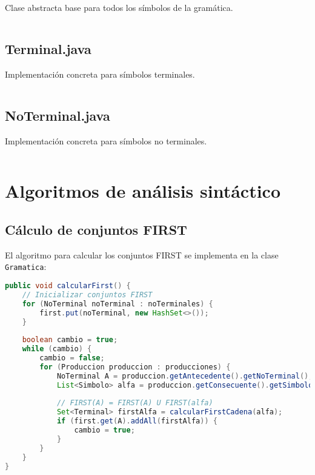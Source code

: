 Clase abstracta base para todos los símbolos de la gramática.

\inputminted[linenos,breaklines,firstline=1,lastline=30]{java}{codigo/src/gramatica/Simbolo.java}

\subsection{Terminal.java}

Implementación concreta para símbolos terminales.

\inputminted[linenos,breaklines,firstline=1,lastline=25]{java}{codigo/src/gramatica/Terminal.java}

\subsection{NoTerminal.java}

Implementación concreta para símbolos no terminales.

\inputminted[linenos,breaklines,firstline=1,lastline=25]{java}{codigo/src/gramatica/NoTerminal.java}

\section{Algoritmos de análisis sintáctico}

\subsection{Cálculo de conjuntos FIRST}

El algoritmo para calcular los conjuntos FIRST se implementa en la clase \texttt{Gramatica}:

\begin{lstlisting}[language=Java, caption=Algoritmo de cálculo de conjuntos FIRST]
public void calcularFirst() {
    // Inicializar conjuntos FIRST
    for (NoTerminal noTerminal : noTerminales) {
        first.put(noTerminal, new HashSet<>());
    }
    
    boolean cambio = true;
    while (cambio) {
        cambio = false;
        for (Produccion produccion : producciones) {
            NoTerminal A = produccion.getAntecedente().getNoTerminal();
            List<Simbolo> alfa = produccion.getConsecuente().getSimbolos();
            
            // FIRST(A) = FIRST(A) U FIRST(alfa)
            Set<Terminal> firstAlfa = calcularFirstCadena(alfa);
            if (first.get(A).addAll(firstAlfa)) {
                cambio = true;
            }
        }
    }
}
\end{lstlisting}

